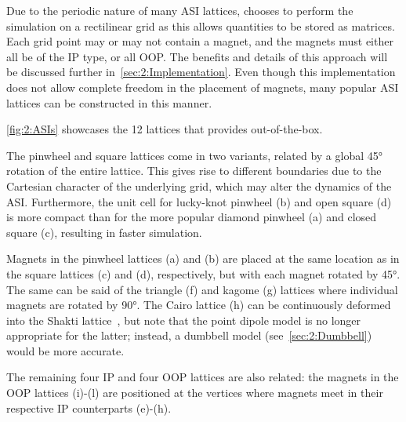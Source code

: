 Due to the periodic nature of many ASI lattices, \hotspice chooses to perform the simulation on a rectilinear grid as this allows quantities to be stored as matrices.
Each grid point may or may not contain a magnet, and the magnets must either all be of the IP type, or all OOP.
The benefits and details of this approach will be discussed further in~\cref{sec:2:Implementation}.
Even though this implementation does not allow complete freedom in the placement of magnets, many popular ASI lattices can be constructed in this manner. \par
\vspace{-1em}

\cref{fig:2:ASIs} showcases the 12 lattices that \hotspice provides out-of-the-box. \par
The pinwheel and square lattices come in two variants, related by a global \ang{45} rotation of the entire lattice.
This gives rise to different boundaries due to the Cartesian character of the underlying grid, which may alter the dynamics of the ASI.
Furthermore, the unit cell for lucky-knot pinwheel (b) and open square (d) is more compact than for the more popular diamond pinwheel (a) and closed square (c), resulting in faster simulation. \par %
Magnets in the pinwheel lattices (a) and (b) are placed at the same location as in the square lattices (c) and (d), respectively, but with each magnet rotated by \ang{45}.
The same can be said of the triangle (f) and kagome (g) lattices where individual magnets are rotated by \ang{90}.
The Cairo lattice (h) can be continuously deformed into the Shakti lattice~\cite{ShaktiCairo}, but note that the point dipole model is no longer appropriate for the latter; instead, a dumbbell model (see~\cref{sec:2:Dumbbell}) would be more accurate. \par
The remaining four IP and four OOP lattices are also related: the magnets in the OOP lattices (i)-(l) are positioned at the vertices where magnets meet in their respective IP counterparts (e)-(h).

